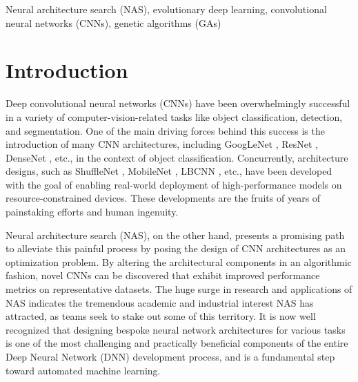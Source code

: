 \documentclass[journal]{IEEEtran}
\theoremstyle{definition}
\theoremstyle{remark}
\begin{document}
\begin{IEEEkeywords}
Neural architecture search (NAS), evolutionary deep learning, convolutional neural networks (CNNs), genetic algorithms (GAs)
\end{IEEEkeywords}

\IEEEpeerreviewmaketitle

\section{Introduction\label{sec:intro}}
Deep convolutional neural networks (CNNs) have been overwhelmingly successful in a variety of computer-vision-related tasks like object classification, detection, and segmentation. One of the main driving forces behind this success is the introduction of many CNN architectures, including GoogLeNet \cite{googlenet}, ResNet \cite{resnet}, DenseNet \cite{densenet}, etc., in the context of object classification. Concurrently, architecture designs, such as ShuffleNet \cite{zhang2018shufflenet}, MobileNet \cite{sandler2018mobilenetv2}, LBCNN \cite{lbcnn}, etc., have been developed with the goal of enabling real-world deployment of high-performance models on resource-constrained devices. These developments are the fruits of years of painstaking efforts and human ingenuity.

Neural architecture search (NAS), on the other hand, presents a promising path to alleviate this painful process by posing the design of CNN architectures as an optimization problem. By altering the architectural components in an algorithmic fashion, novel CNNs can be discovered that exhibit improved performance metrics on representative datasets. The huge surge in research and applications of NAS indicates the tremendous academic and industrial interest NAS has attracted, as teams seek to stake out some of this territory. It is now well recognized that designing bespoke neural network architectures for various tasks is one of the most challenging and practically beneficial components of the entire Deep Neural Network (DNN) development process, and is a fundamental step toward automated machine learning.
\end{document}

